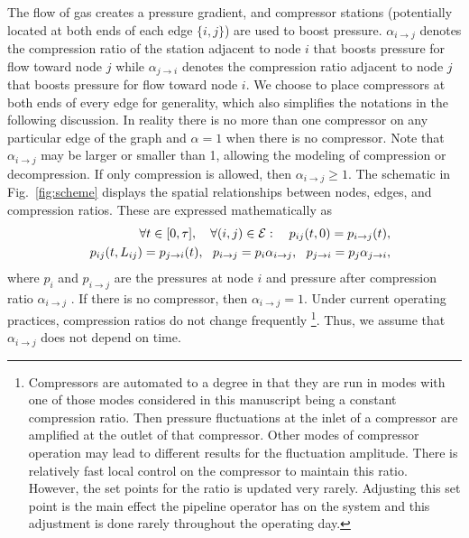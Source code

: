 \documentclass[10pt, conference, compsocconf]{IEEEtran}
\begin{document}
The flow of gas creates a pressure gradient, and compressor stations (potentially located at both ends of each edge $\{i,j\}$) are used to boost pressure.  $\alpha_{i\to j}$ denotes the compression ratio of the station adjacent to node $i$ that boosts pressure for flow toward node $j$ while $\alpha_{j\to i}$ denotes the compression ratio adjacent to node $j$ that boosts pressure for flow toward node $i$. We choose to place compressors at both ends of every edge for generality, which also simplifies the notations in the following discussion. In reality there is no more than one compressor on any particular edge of the graph and $\alpha=1$ when there is no compressor. Note that $\alpha_{i\to j}$ may be larger or smaller than 1, allowing the modeling of compression or decompression.  If only compression is allowed, then $\alpha_{i\to j}\geq 1$. The schematic in Fig.~\ref{fig:scheme} displays the spatial relationships between nodes, edges, and compression ratios. These are expressed mathematically as
\begin{eqnarray}
&&\hspace{-0.5cm}\forall t\in [0,\tau],\quad \forall (i,j)\in{\cal E}:\quad p_{ij}(t,0)=p_{i\to j}(t),\label{compressor}\\ && p_{ij}(t,L_{ij})=p_{j\to i}(t),\ \ p_{i\to j}=p_i \alpha_{i\to j},\ \ p_{j\to i}=p_j \alpha_{j\to i}, \nonumber
\end{eqnarray}
where $p_i$ and $p_{i\to j}$ are the pressures at node $i$ and pressure after compression ratio $\alpha_{i\to j}$ . If there is no compressor, then $\alpha_{i\to j}=1$. Under current operating practices, compression ratios do not change frequently \footnote{Compressors are automated to a degree in that they are run in modes with one of those modes considered in this manuscript being a constant compression ratio. Then pressure fluctuations at the inlet of a compressor are amplified at the outlet of that compressor.  Other modes of compressor operation may lead to different results for the fluctuation amplitude. There is relatively fast local control on the compressor to maintain this ratio. However, the set points for the ratio is updated very rarely. Adjusting this set point is the main effect the pipeline operator has on the system and this adjustment is done rarely throughout the operating day.}. Thus, we assume that $\alpha_{i\to j}$ does not depend on time.
\end{document}
